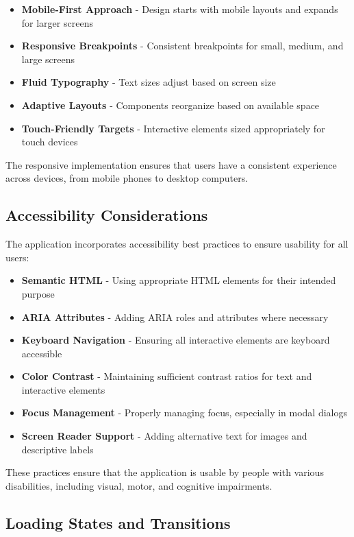 \begin{itemize}
  \item \textbf{Mobile-First Approach} - Design starts with mobile layouts and expands for larger screens
  \item \textbf{Responsive Breakpoints} - Consistent breakpoints for small, medium, and large screens
  \item \textbf{Fluid Typography} - Text sizes adjust based on screen size
  \item \textbf{Adaptive Layouts} - Components reorganize based on available space
  \item \textbf{Touch-Friendly Targets} - Interactive elements sized appropriately for touch devices
\end{itemize}

The responsive implementation ensures that users have a consistent experience across devices, from mobile phones to desktop computers.

\subsection{Accessibility Considerations}

The application incorporates accessibility best practices to ensure usability for all users:

\begin{itemize}
  \item \textbf{Semantic HTML} - Using appropriate HTML elements for their intended purpose
  \item \textbf{ARIA Attributes} - Adding ARIA roles and attributes where necessary
  \item \textbf{Keyboard Navigation} - Ensuring all interactive elements are keyboard accessible
  \item \textbf{Color Contrast} - Maintaining sufficient contrast ratios for text and interactive elements
  \item \textbf{Focus Management} - Properly managing focus, especially in modal dialogs
  \item \textbf{Screen Reader Support} - Adding alternative text for images and descriptive labels
\end{itemize}

These practices ensure that the application is usable by people with various disabilities, including visual, motor, and cognitive impairments.

\subsection{Loading States and Transitions}

